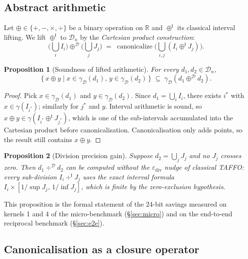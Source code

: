 \documentclass[11pt,a4paper]{article}
\theoremstyle{plain}
\newtheorem{proposition}{Proposition}
\begin{document}
\subsection{Abstract arithmetic}
\label{sec:abstract-arith}

Let $\oplus\in\{+,-,\times,\div\}$ be a binary operation on
$\mathbb{R}$ and $\oplus^{\mathsf{I}}$ its classical interval lifting.
We lift $\oplus^{\mathsf{I}}$ to $\mathcal{D}_n$ by the
\emph{Cartesian product construction}:
\[
\Big(\bigcup_i I_i\Big) \oplus^{\mathcal{D}} \Big(\bigcup_j J_j\Big)
  \;=\; \operatorname{canonicalize}\Big(\bigcup_{i,j} (I_i \oplus^{\mathsf{I}} J_j)\Big).
\]

\begin{proposition}[Soundness of lifted arithmetic]\label{prop:sound-arith}
For every $d_1,d_2\in\mathcal{D}_n$,
\[
\{\,x\oplus y\mid x\in\gamma_{\mathcal{D}}(d_1),\,y\in\gamma_{\mathcal{D}}(d_2)\,\}\;\subseteq\;\gamma_{\mathcal{D}}(d_1 \oplus^{\mathcal{D}} d_2).
\]
\end{proposition}
\begin{proof}
Pick $x\in\gamma_{\mathcal{D}}(d_1)$ and $y\in\gamma_{\mathcal{D}}(d_2)$.
Since $d_1 = \bigcup_i I_i$, there exists $i^*$ with
$x\in\gamma(I_{i^*})$; similarly for $j^*$ and $y$. Interval
arithmetic is sound, so $x\oplus y\in\gamma(I_{i^*}\oplus^{\mathsf{I}}J_{j^*})$,
which is one of the sub-intervals accumulated into the Cartesian
product before canonicalisation. Canonicalisation only adds points,
so the result still contains $x\oplus y$.
\end{proof}

\begin{proposition}[Division precision gain]\label{prop:div-gain}
Suppose $d_2 = \bigcup_j J_j$ and no $J_j$ crosses zero. Then
$d_1\div^{\mathcal{D}} d_2$ can be computed without the
$\varepsilon_{\text{div}}$ nudge of classical TAFFO: every sub-division
$I_i\div^{\mathsf{I}}J_j$ uses the \emph{exact} interval formula
$I_i\times[1/\sup J_j,\,1/\inf J_j]$, which is finite by the
zero-exclusion hypothesis.
\end{proposition}
\noindent
This proposition is the formal statement of the 24-bit savings
measured on kernels 1 and 4 of the micro-benchmark (\S\ref{sec:micro})
and on the end-to-end reciprocal benchmark (\S\ref{sec:e2e}).

\subsection{Canonicalisation as a closure operator}
\label{sec:canonicalisation}
\end{document}
